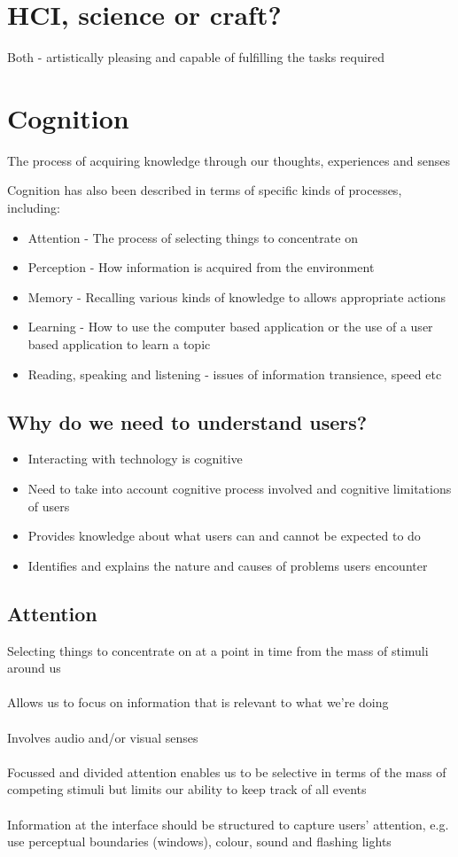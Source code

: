 \documentclass{article}[18pt]
\begin{document}
\section{HCI, science or craft?}
Both - artistically pleasing and capable of fulfilling the tasks required
\section{Cognition}
\begin{definition}[Cognition]
The process of acquiring knowledge through our thoughts, experiences and senses
\end{definition}
Cognition has also been described in terms of specific kinds of processes, including:
\begin{itemize}
	\item Attention - The process of selecting things to concentrate on
	\item Perception - How information is acquired from the environment
	\item Memory - Recalling various kinds of knowledge to allows appropriate actions
	\item Learning - How to use the computer based application or the use of a user based application to learn a topic
	\item Reading, speaking and listening - issues of information transience, speed etc
\end{itemize}
\subsection{Why do we need to understand users?}
\begin{itemize}
	\item Interacting with technology is cognitive
	\item Need to take into account cognitive process involved and cognitive limitations of users
	\item Provides knowledge about what users can and cannot be expected to do
	\item Identifies and explains the nature and causes of problems users encounter
\end{itemize}
\subsection{Attention}
Selecting things to concentrate on at a point in time from the mass of stimuli around us\\
\\
Allows us to focus on information that is relevant to what we're doing\\
\\
Involves audio and/or visual senses\\
\\
Focussed and divided attention enables us to be selective in terms of the mass of competing stimuli but limits our ability to keep track of all events\\
\\
Information at the interface should be structured to capture users' attention, e.g. use perceptual boundaries (windows), colour, sound and flashing lights
\end{document}
